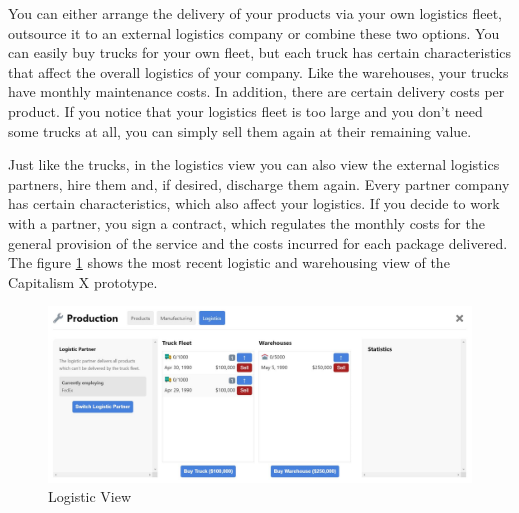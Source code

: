 You can either arrange the delivery of your products via your own logistics fleet, outsource it to an external logistics company or combine these two options. You can easily buy trucks for your own fleet, but each truck has certain characteristics that affect the overall logistics of your company. Like the warehouses, your trucks have monthly maintenance costs. In addition, there are certain delivery costs per product. If you notice that your logistics fleet is too large and you don't need some trucks at all, you can simply sell them again at their remaining value.

Just like the trucks, in the logistics view you can also view the external logistics partners, hire them and, if desired, discharge them again. Every partner company has certain characteristics, which also affect your logistics. If you decide to work with a partner, you sign a contract, which regulates the monthly costs for the general provision of the service and the costs incurred for each package delivered. 
The figure \ref{fig:logistic_view} shows the most recent logistic and warehousing view  of the Capitalism X prototype.

\begin{figure}
    \centering
    \includegraphics [width=\textwidth]{images/logistic_view.png}
    \caption{Logistic View}
    \label{fig:logistic_view}
\end{figure}